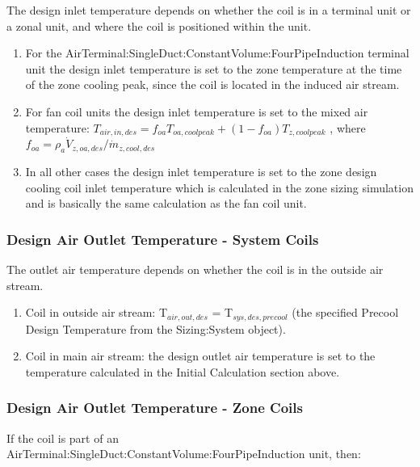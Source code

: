 The design inlet temperature depends on whether the coil is in a terminal unit or a zonal unit, and where the coil is positioned within the unit.

\begin{enumerate}
\def\labelenumi{\arabic{enumi}.}
\item
  For the AirTerminal:SingleDuct:ConstantVolume:FourPipeInduction terminal unit the design inlet temperature is set to the zone temperature at the time of the zone cooling peak, since the coil is located in the induced air stream.
\item
  For fan coil units the design inlet temperature is set to the mixed air temperature: \(T_{air,in,des} = f_{oa}T_{oa,coolpeak} + \left(1-f_{oa}\right)T_{z,coolpeak}\) , where \(f_{oa} = \rho_a \dot V_{z,oa,des} / \dot m_{z,cool,des}\)
\item
  In all other cases the design inlet temperature is set to the zone design cooling coil inlet temperature which is calculated in the zone sizing simulation and is basically the same calculation as the fan coil unit.
\end{enumerate}

\subsubsection{Design Air Outlet Temperature - System Coils}\label{design-air-outlet-temperature---system-coils}

The outlet air temperature depends on whether the coil is in the outside air stream.

\begin{enumerate}
\def\labelenumi{\arabic{enumi}.}
\item
  Coil in outside air stream: T\(_{air,out,des}\) = T\(_{sys,des,precool}\) (the specified Precool Design Temperature from the Sizing:System object).
\item
  Coil in main air stream: the design outlet air temperature is set to the temperature calculated in the Initial Calculation section above.
\end{enumerate}

\subsubsection{Design Air Outlet Temperature - Zone Coils}\label{design-air-outlet-temperature---zone-coils}

If the coil is part of an AirTerminal:SingleDuct:ConstantVolume:FourPipeInduction unit, then:

